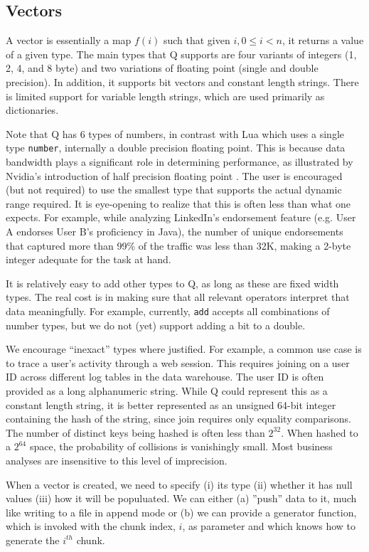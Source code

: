 \subsection{Vectors}
\label{Vectors}
A vector is essentially a map \(f(i)\) such that given \(i, 0 \leq i < n\), it
returns a value of a given type. The main types that Q supports are four variants
of integers (1, 2, 4, and 8 byte) and two variations of floating point (single
and double precision). In addition, it supports bit vectors and constant length
strings. There is limited support for variable length strings, which are used
primarily as dictionaries. 

Note that Q has 6 types of numbers, in contrast with Lua which uses a 
single type {\tt number}, internally a double precision floating point.
This is because data bandwidth plays a significant role in determining
performance, as illustrated by Nvidia's
introduction of half precision floating point  \cite{nvidia2017}. The user is
encouraged (but not required) to use the smallest type that supports the actual
dynamic range required. It is eye-opening to realize that this is often  less
than what one expects. For example, while analyzing LinkedIn's endorsement feature
(e.g. User A endorses User B's proficiency in Java),
the number of unique endorsements that captured more than 99\% of the traffic
was less than 32K, making a 2-byte integer adequate for the task at hand.

It is relatively easy to add other types to Q, as long as these 
are fixed width types. The real cost is in making sure that all relevant
operators interpret that data meaningfully. For example, currently, {\tt add}
accepts all combinations of number types, but we do not (yet)
support adding a bit to a double.

We
encourage ``inexact'' types where justified. For example, a common use case is
to trace a user's activity through a web session. This requires joining on a
user ID across different log tables in the data warehouse. The user ID is
often provided as a long alphanumeric string. While Q could represent this as a
constant length string, it is better represented as an unsigned 64-bit integer
containing the hash of the string, since join requires only equality comparisons.
The number of distinct keys being hashed is often less than \(2^{32}\). When
hashed to a \(2^{64}\) space, the probability of collisions is vanishingly
small. Most business analyses are insensitive to this level of imprecision.

When a vector is created, we need to specify (i) its type (ii) whether it has
null values (iii) how it will be populuated. We can either (a) ''push'' data to
it, much like writing to a file in append mode or (b) we can provide a generator function,
which is invoked with the chunk index, \(i\), as parameter and which knows how to
generate the \(i^{th}\) chunk.

